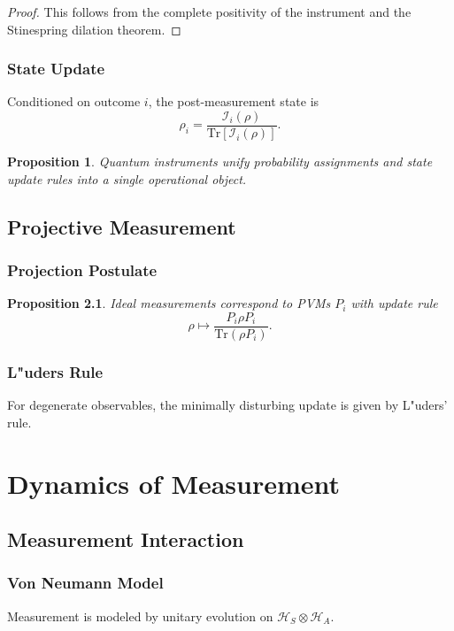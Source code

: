 \documentclass[12pt]{book}
\theoremstyle{plain}
\newtheorem{proposition}[theorem]{Proposition}
\theoremstyle{definition}
\theoremstyle{remark}
\begin{document}
\begin{proof}
This follows from the complete positivity of the instrument and the Stinespring dilation theorem.
\end{proof}

\section{State Update}
Conditioned on outcome $i$, the post-measurement state is
\[
\rho_i = \frac{\mathcal{I}_i(\rho)}{\mathrm{Tr}[\mathcal{I}_i(\rho)]}.
\]

\begin{proposition}
Quantum instruments unify probability assignments and state update rules into a single operational object.
\end{proposition}

\chapter{Projective Measurement}

\section{Projection Postulate}

\begin{proposition}
Ideal measurements correspond to PVMs ${P_i}$ with update rule
\[
\rho \mapsto \frac{P_i \rho P_i}{\mathrm{Tr}(\rho P_i)}.
\]
\end{proposition}

\section{L"uders Rule}
For degenerate observables, the minimally disturbing update is given by L"uders' rule.

\part{Dynamics of Measurement}

\chapter{Measurement Interaction}

\section{Von Neumann Model}
Measurement is modeled by unitary evolution on $\mathcal{H}_S \otimes \mathcal{H}_A$.
\end{document}
